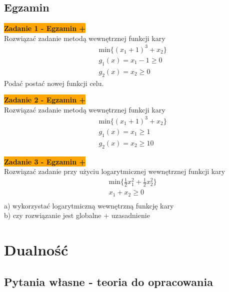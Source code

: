 \documentclass[a4paper,11pt]{article}
\begin{document}
\subsection{Egzamin}

\begin{framed}
\textbf{\colorbox{orange}{Zadanie 1 - Egzamin +}} \\
Rozwiązać zadanie metodą wewnętrznej funkcji kary
\begin{align*}
& \text{min} \{ (x_1+1)^3 + x_2 \} \\
& g_1(x) = x_1-1 \geq 0 \\
& g_2(x) = x_2 \geq 0 
\end{align*}
Podać postać nowej funkcji celu.
\end{framed}

\begin{framed}
\textbf{\colorbox{orange}{Zadanie 2 - Egzamin +}} \\
Rozwiązać zadanie metodą wewnętrznej funkcji kary
\begin{align*}
& \text{min} \{ (x_1+1)^3 + x_2 \} \\
& g_1(x) = x_1 \geq 1 \\
& g_2(x) = x_2 \geq 10 
\end{align*}
\end{framed}

\begin{framed}
\textbf{\colorbox{orange}{Zadanie 3 - Egzamin + }} \\
Rozwiązać zadanie przy użyciu logarytmicznej wewnętrznej funkcji kary
\begin{align*}
& \text{min} \{ \frac{1}{2}x_1^2 + \frac{1}{2}x_2^2 \} \\
&  x_1 + x_2 \geq 0 \\
\end{align*}
a) wykorzystać logarytmiczną wewnętrzną funkcję kary \\ 
b) czy rozwiązanie jest globalne + uzasadnienie
\end{framed}






\newpage
\section{Dualność}

\subsection{Pytania własne - teoria do opracowania}
\end{document}

